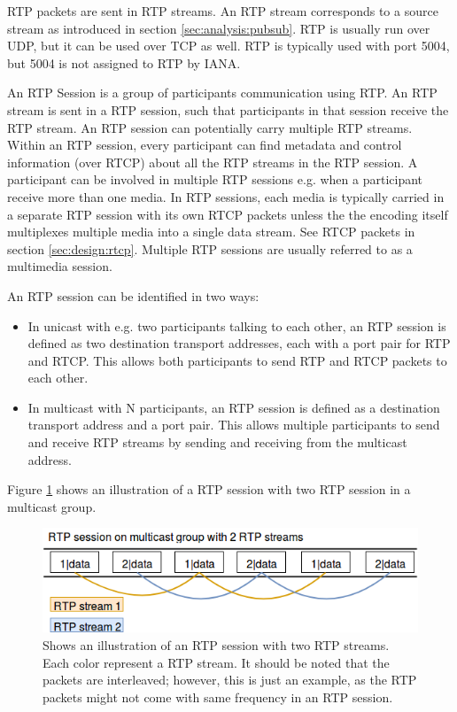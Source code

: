  \label{sec:design:rtpstream}
RTP packets are sent in RTP streams. An RTP stream corresponds to a source stream as introduced in section \ref{sec:analysis:pubsub}. RTP is usually run over UDP, but it can be used over TCP as well. RTP is typically used with port 5004, but 5004 is not assigned to RTP by IANA\citep{iana_ports}.


 \label{sec:design:rtpsession}
An RTP Session is a group of participants communication using RTP.
An RTP stream is sent in a RTP session, such that participants in that session receive the RTP stream. An RTP session can potentially carry multiple RTP streams. Within an RTP session, every participant can find metadata and control information (over RTCP) about all the RTP streams in the RTP session. A participant can be involved in multiple RTP sessions e.g. when a participant receive more than one media. In RTP sessions, each media is typically carried in a separate RTP session with its own RTCP packets unless the the encoding itself multiplexes multiple media into a single data stream. See RTCP packets in section \ref{sec:design:rtcp}. Multiple RTP sessions are usually referred to as a multimedia session.


An RTP session can be identified in two ways:
\begin{itemize}
	\item In unicast with e.g. two participants talking to each other, an RTP session is defined as two destination transport addresses, each with a port pair for RTP and RTCP. This allows both participants to send RTP and RTCP packets to each other.
	\item In multicast with N participants, an RTP session is defined as a destination transport address and a port pair. This allows multiple participants to send and receive RTP streams by sending and receiving from the multicast address.
\end{itemize}


Figure  \ref{fig:design:rtp:session} shows an illustration of a RTP session with two RTP session in a multicast group.
\begin{figure}[H]
	\centering
	\includegraphics[width=\textwidth]{figures/rtp-session}
	\caption{Shows an illustration of an RTP session with two RTP streams. Each color represent a RTP stream. It should be noted that the packets are interleaved; however, this is just an example, as the RTP packets might not come with same frequency in an RTP session.} \label{fig:design:rtp:session}
\end{figure}

